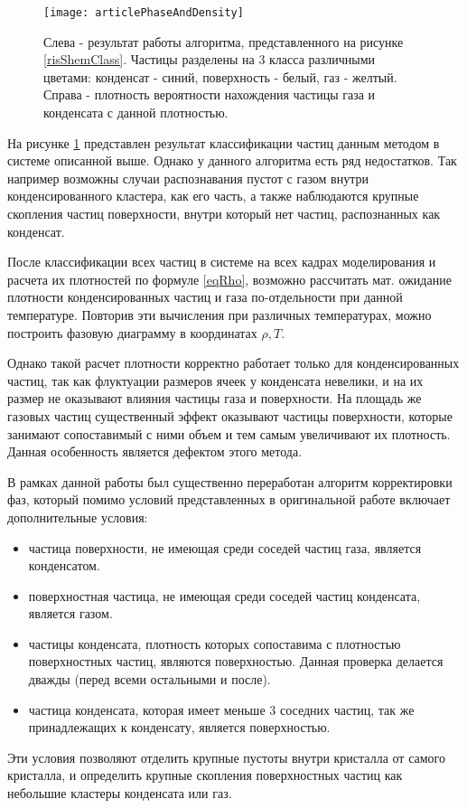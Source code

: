 \begin{figure}[h]
\begin{center}
\texttt{[image: articlePhaseAndDensity]}
\caption{Слева - результат работы алгоритма, представленного на рисунке \ref{risShemClass}. Частицы разделены на 3 класса различными цветами: конденсат - синий, поверхность - белый, газ - желтый. Справа - плотность вероятности нахождения частицы газа и конденсата с данной плотностью.}
\label{risClassification}
\end{center}
\end{figure}

На рисунке \ref{risClassification} представлен результат классификации частиц данным методом в системе описанной выше.
Однако у данного алгоритма есть ряд недостатков. Так например возможны случаи распознавания пустот с газом внутри конденсированного кластера, как его часть, а также наблюдаются крупные скопления частиц поверхности, внутри который нет частиц, распознанных как конденсат.

После классификации всех частиц в системе на всех кадрах моделирования и расчета их плотностей по формуле \ref{eqRho}, возможно рассчитать мат. ожидание плотности конденсированных частиц и газа по-отдельности при данной температуре.
Повторив эти вычисления при различных температурах, можно построить фазовую диаграмму в координатах $\rho, T$.

Однако такой расчет плотности корректно работает только для конденсированных частиц, так как флуктуации размеров ячеек у конденсата невелики, и на их размер не оказывают влияния частицы газа и поверхности. На площадь же газовых частиц существенный эффект оказывают частицы поверхности, которые занимают сопоставимый с ними объем и тем самым увеличивают их плотность. Данная особенность является дефектом этого метода.

В рамках данной работы был существенно переработан алгоритм корректировки фаз, который помимо условий представленных в оригинальной работе включает дополнительные условия:
\begin{itemize}
\item частица поверхности, не имеющая среди соседей частиц газа, является конденсатом.
\item поверхностная частица, не имеющая среди соседей частиц конденсата, является газом.
\item частицы конденсата, плотность которых сопоставима с плотностью поверхностных частиц, являются поверхностью. Данная проверка делается дважды (перед всеми остальными и после).
\item частица конденсата, которая имеет меньше 3 соседних частиц, так же принадлежащих к конденсату, является поверхностью.
\end{itemize}
Эти условия позволяют отделить крупные пустоты внутри кристалла от самого кристалла, и определить крупные скопления поверхностных частиц как небольшие кластеры конденсата или газ.

